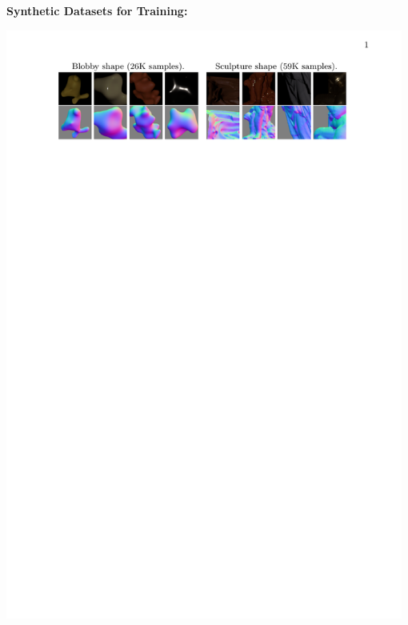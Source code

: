 \documentclass[portrait,a0paper,fontscale=0.292]{baposter}
\begin{document}
\begin{poster}
{\begin{minipage}[t]{0.4\textwidth}
    \vspace{0.5em}
    \textbf{\color{blue}Synthetic Datasets for Training:} 
    \vspace{-0.5em}
    \begin{center}
        \includegraphics[width=0.98\textwidth]{images/datasets.pdf}
    \end{center}
\end{minipage}
}


\end{poster}
\end{document}
